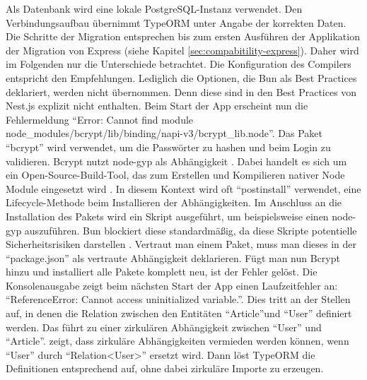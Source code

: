 {\noindent
Als Datenbank wird eine lokale PostgreSQL-Instanz verwendet. Den Verbindungsaufbau übernimmt TypeORM unter Angabe der korrekten Daten. Die Schritte der Migration entsprechen bis zum ersten Ausführen der Applikation der Migration von Express (siehe Kapitel \ref{sec:compabitility-express}). Daher wird im Folgenden nur die Unterschiede betrachtet. Die Konfiguration des Compilers entspricht den Empfehlungen. Lediglich die Optionen, die Bun als Best Practices deklariert, werden nicht übernommen. Denn diese sind in den Best Practices von Nest.js explizit nicht enthalten. \newline
Beim Start der App erscheint nun die Fehlermeldung ``Error: Cannot find module node\_modules/bcrypt/lib/binding/napi-v3/bcrypt\_lib.node''. Das Paket ``bcrypt'' wird verwendet, um die Passwörter zu hashen und beim Login zu validieren. Bcrypt nutzt node-gyp als Abhängigkeit \cite{DelGobbo.2018}. Dabei handelt es sich um ein Open-Source-Build-Tool, das zum Erstellen und Kompilieren nativer Node Module eingesetzt wird \cite{OpenJSFoundation.o.J.b}. In diesem Kontext wird oft ``postinstall'' verwendet, eine Lifecycle-Methode beim Installieren der Abhängigkeiten. Im Anschluss an die Installation des Pakets wird ein Skript ausgeführt, um beispielsweise einen node-gyp auszuführen. Bun blockiert diese standardmäßig, da diese Skripte potentielle Sicherheitsrisiken darstellen \cite{OvenSh.2023}. Vertraut man einem Paket, muss man dieses in der ``package.json'' als vertraute Abhängigkeit deklarieren. Fügt man nun Bcrypt hinzu und installiert alle Pakete komplett neu, ist der Fehler gelöst. \newline
Die Konsolenausgabe zeigt beim nächsten Start der App einen Laufzeitfehler an: ``ReferenceError: Cannot access uninitialized variable.''. Dies tritt an der Stellen auf, in denen die Relation zwischen den Entitäten ``Article''und ``User'' definiert werden. Das führt zu einer zirkulären Abhängigkeit zwischen ``User'' und ``Article''. \cite{TypeORM.} zeigt, dass zirkuläre Abhängigkeiten vermieden werden können, wenn ``User'' durch ``Relation<User>'' ersetzt wird. Dann löst TypeORM die Definitionen entsprechend auf, ohne dabei zirkuläre Importe zu erzeugen.\\

}
